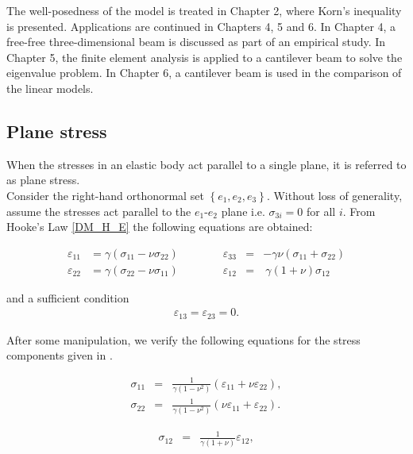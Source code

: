 \documentclass[../../main.tex]{subfiles}ite{VS18}
\begin{document}
The well-posedness of the model is treated in Chapter 2, where Korn's
inequality is presented. Applications are continued in Chapters 4, 5 and 6. In
Chapter 4, a free-free three-dimensional beam is discussed as part of an
empirical study. In Chapter 5, the finite element analysis is applied to a
cantilever beam to solve the eigenvalue problem. In Chapter 6, a cantilever
beam is used in the comparison of the linear models.

\subsection{Plane stress}\label{ssec:3D_Model:PlaneStress}
When the stresses in an elastic body act parallel to a single plane, it is
referred to as plane stress.\\

Consider the right-hand orthonormal set $\left\{e_1, e_2, e_3\right\}$. Without
loss of generality, assume the stresses act parallel to the $e_1$-$e_2$ plane
i.e. $\sigma_{3i} = 0$ for all $i$. From Hooke's Law \eqref{DM_H_E} the
following equations are obtained: \label{sym:e_i}

\begin{equation}
	\begin{aligned}
		\varepsilon_{11} & =  \gamma  ( \sigma_{11} - \nu \sigma_{22}) \qquad \qquad \varepsilon_{33} & = & - \gamma \nu (\sigma_{11} + \sigma_{22})          \\
		\varepsilon_{22} & =   \gamma (\sigma_{22} - \nu\sigma_{11}) \qquad \qquad \varepsilon_{12}   & = & \  \gamma (1+\nu) \sigma_{12} \label{strain_comp}
	\end{aligned}
\end{equation}

and a sufficient condition
\begin{eqnarray}
	\varepsilon_{13} =  \varepsilon_{23} = 0.
\end{eqnarray}

After some manipulation, we verify the following equations for the stress
components given in \cite{Fung65}.

\noindent
\begin{minipage}{.5\linewidth}
	\begin{eqnarray*}
		\sigma_{11} & = & \frac{1}{\gamma(1-\nu^2)} ( \varepsilon_{11} + \nu\varepsilon_{22}),\\
		\sigma_{22} & = & \frac{1}{\gamma(1-\nu^2)} (\nu \varepsilon_{11} + \varepsilon_{22}).
	\end{eqnarray*}
\end{minipage}%
\begin{minipage}{.5\linewidth}
	\begin{eqnarray}
		\sigma_{12} & = & \frac{1}{\gamma(1+\nu)} \varepsilon_{12}, \label{stress_comp}
	\end{eqnarray}
\end{minipage}\\
\end{document}

